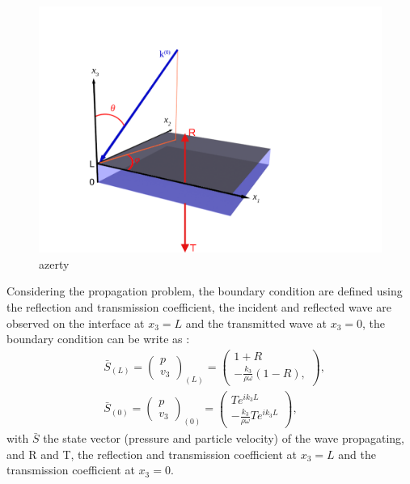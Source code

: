 \documentclass{article}
\begin{document}
    \begin{figure}[ht!]
        \centering
        \includegraphics[scale=0.6]{Fig3D.png}
        \caption{azerty}
        \label{Schema_PB}
    \end{figure}
    
    Considering the propagation problem, the boundary condition are defined using the reflection and transmission coefficient, the incident and reflected wave are observed on the interface at $x_3=L$ and the transmitted wave at $x_3=0$, the boundary condition can be write as :
     \begin{align}
    &\bar{S}_{(L)}=\begin{pmatrix}
    	p \\ v_3
    \end{pmatrix}_{(L)}=\begin{pmatrix}
    					    1+R \\ -\frac{k_3}{\rho \omega}(1-R),
    					\end{pmatrix},\label{BC_L} \\
  	&\bar{S}_{(0)}=\begin{pmatrix}
    	p \\ v_3
    \end{pmatrix}_{(0)}=\begin{pmatrix}
    						Te^{ik_3L} \\ -\frac{k_3}{\rho \omega}Te^{ik_3L}
    					\end{pmatrix},\label{BC_0}
    \end{align}                         
    with $\bar{S}$ the state vector (pressure and particle velocity) of the wave propagating, and R and T, the reflection and transmission coefficient at $x_3=L$ and the transmission coefficient at $x_3=0$.  
    
\end{document}
